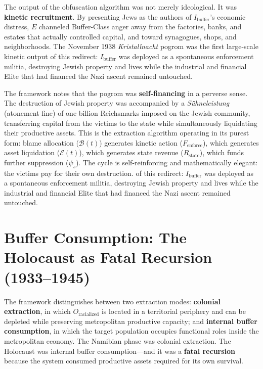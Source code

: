 The output of the obfuscation algorithm was not merely ideological. It was \textbf{kinetic recruitment}. By presenting Jews as the authors of $I_{\text{buffer}}$'s economic distress, $E$ channeled Buffer-Class anger away from the factories, banks, and estates that actually controlled capital, and toward synagogues, shops, and neighborhoods. The November 1938 \textit{Kristallnacht} pogrom was the first large-scale kinetic output of this redirect: $I_{\text{buffer}}$ was deployed as a spontaneous enforcement militia, destroying Jewish property and lives while the industrial and financial Elite that had financed the Nazi ascent remained untouched.

The framework notes that the pogrom was \textbf{self-financing} in a perverse sense. The destruction of Jewish property was accompanied by a \textit{S\"{u}hneleistung} (atonement fine) of one billion Reichsmarks imposed on the Jewish community, transferring capital from the victims to the state while simultaneously liquidating their productive assets. This is the extraction algorithm operating in its purest form: blame allocation ($\mathcal{B}(t)$) generates kinetic action ($F_{\text{enforce}}$), which generates asset liquidation ($\mathcal{E}(t)$), which generates state revenue ($R_{\text{state}}$), which funds further suppression ($\psi_s$). The cycle is self-reinforcing and mathematically elegant: the victims pay for their own destruction. of this redirect: $I_{\text{buffer}}$ was deployed as a spontaneous enforcement militia, destroying Jewish property and lives while the industrial and financial Elite that had financed the Nazi ascent remained untouched.


\section{Buffer Consumption: The Holocaust as Fatal Recursion (1933--1945)}
\label{sec:buffer_consumption}

The framework distinguishes between two extraction modes: \textbf{colonial extraction}, in which $O_{\text{racialized}}$ is located in a territorial periphery and can be depleted while preserving metropolitan productive capacity; and \textbf{internal buffer consumption}, in which the target population occupies functional roles inside the metropolitan economy. The Namibian phase was colonial extraction. The Holocaust was internal buffer consumption---and it was a \textbf{fatal recursion} because the system consumed productive assets required for its own survival.

